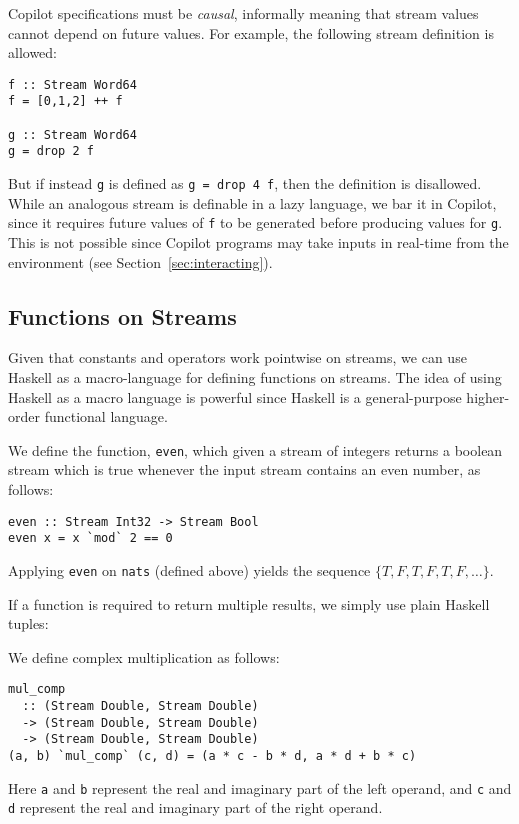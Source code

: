 Copilot specifications must be \emph{causal}, informally meaning that
stream values cannot depend on future values.  For example, the following stream
definition is allowed:
%
\begin{lstlisting}[frame=single]
f :: Stream Word64
f = [0,1,2] ++ f

g :: Stream Word64
g = drop 2 f
\end{lstlisting}
%

But if instead {\tt g} is defined as {\tt g = drop 4 f}, then the definition is
disallowed.  While an analogous stream is definable in a lazy language, we bar
it in Copilot, since it requires future values of {\tt f} to be
generated before producing values for {\tt g}.  This is not possible since
Copilot programs may take inputs in real-time from the environment (see
Section~\ref{sec:interacting}).

\subsection{Functions on Streams} \label{sec:FnOnStreams}

Given that constants and operators work pointwise on streams, we can use Haskell
as a macro-language for defining functions on streams.  The idea of using
Haskell as a macro language is powerful since Haskell is a
general-purpose higher-order functional language.

\begin{example}
We define the function, {\tt even}, which given a stream of
integers returns a boolean stream which is true whenever the input stream
contains an even number, as follows:
%
\begin{lstlisting}[frame=single]
even :: Stream Int32 -> Stream Bool
even x = x `mod` 2 == 0
\end{lstlisting}
%
Applying {\tt even} on {\tt nats} (defined above) yields the sequence
$\{T, F, T, F, T, F, \dots\}$.
\end{example}

If a function is required to return multiple results, we simply use plain
Haskell tuples:

\begin{example}
We define complex multiplication as follows:
%
\begin{lstlisting}[frame=single]
mul_comp
  :: (Stream Double, Stream Double)
  -> (Stream Double, Stream Double)
  -> (Stream Double, Stream Double)
(a, b) `mul_comp` (c, d) = (a * c - b * d, a * d + b * c)
\end{lstlisting}
%
Here {\tt a} and {\tt b} represent the real and imaginary part of the left
operand, and {\tt c} and {\tt d} represent the real and imaginary part
of the right operand.
\end{example}

